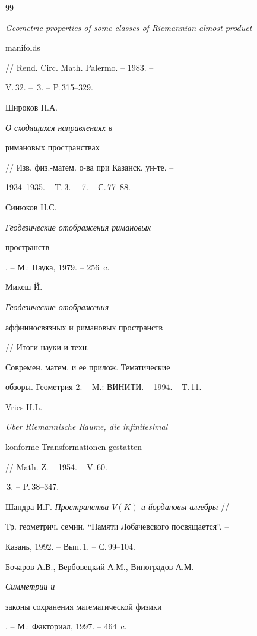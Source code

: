 \begin{thebibliography}{99}
{\em Geometric properties of some classes of Riemannian almost-product


manifolds} // Rend. Circ. Math. Palermo. -- 1983. --


V.\,32. -- \No\,3. -- P.\,315--329.




Широков П.А. {\em О сходящихся направлениях в


римановых пространствах} // Изв. физ.-матем. о-ва при Казанск. ун-те. --


1934--1935. -- T.\,3. -- \No\,7. -- С.\,77--88.




Синюков Н.С. {\em Геодезические отображения римановых


пространств}. -- М.: Наука, 1979. -- 256~c.




Микеш Й. {\em Геодезические отображения


аффинносвязных и римановых пространств} // Итоги науки и техн.


Современ. матем. и ее прилож. Тематические


обзоры. Геометрия-2. -- M.: ВИНИТИ. -- 1994. -- Т.\,11.




Vries H.L. {\em Uber Riemannische Raume, die infinitesimal


konforme Transformationen gestatten} // Math. Z. -- 1954. -- V.\,60. --


\No\,3. -- P.\,38--347.




Шандра И.Г. {\em Пространства $V(K)$ и йордановы алгебры} //


Тр. геометрич. семин. ``Памяти Лобачевского посвящается''. --


Казань, 1992. -- Вып.\,1. -- С.\,99--104.




Бочаров А.В., Вербовецкий А.М., Виноградов А.М. {\em Симметрии и


законы сохранения математической физики}. -- М.: Факториал, 1997. -- 464~c.





\end{thebibliography}





\vskip 2cm












\label{end}





